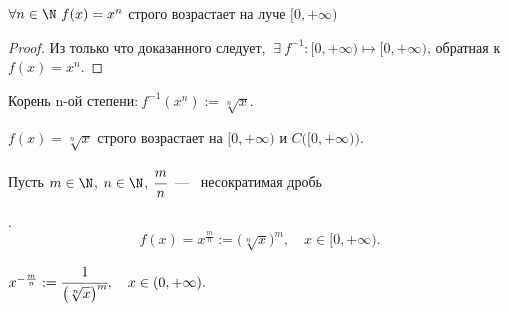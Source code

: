 \begin{lemma}
    $\forall n\in \N \ f(x) = x^{n}$ строго возрастает на луче $[0, +\infty)$
\end{lemma}
\begin{proof}
    Из только что доказанного следует, $
    \ \exists \  f^{-1}: [0, +\infty) \mapsto [0, +\infty)
    $, обратная к $f(x) = x^{n}$.
\end{proof}

\begin{definition}
    Корень n-ой степени:$ \ f^{-1}(x^{n}) := \sqrt[n]{x}$.
\end{definition}
\begin{note}
\hypertarget{upppp}{$f (x) = \sqrt[n]{x}$ строго возрастает на $[0, +\infty)$ и $C \big( [0, +\infty) \big).$}
\end{note}
\begin{definition}
\hypertarget{def4.33}{Пусть $m \in \N$, $n \in \N$, $\cfrac{m}{n}$~---~ несократимая дробь}. $$f(x) = x^{\frac{m}{n}} := \big(\sqrt[n]{x}\big)^{m}, \quad x\in [0,+\infty).$$
\end{definition}
\begin{definition}
$x^{-\frac{m}{n}} := \cfrac{1}{\big(\sqrt[n]{x}\big)^{m}}, \quad x\in (0,+\infty).$
\end{definition}

